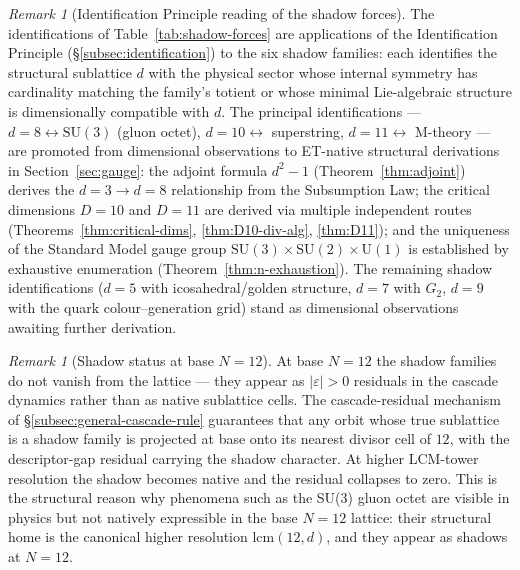 \documentclass[11pt,a4paper]{article}
\theoremstyle{definition}
\theoremstyle{remark}
\newtheorem{remark}[theorem]{Remark}
\begin{document}
\begin{remark}[Identification Principle reading of the shadow forces]\label{rem:shadow-identification}
The identifications of Table~\ref{tab:shadow-forces} are applications of the Identification Principle (\S\ref{subsec:identification}) to the six shadow families: each identifies the structural sublattice $d$ with the physical sector whose internal symmetry has cardinality matching the family's totient or whose minimal Lie-algebraic structure is dimensionally compatible with $d$. The principal identifications --- $d=8 \leftrightarrow \mathrm{SU}(3)$ (gluon octet), $d=10 \leftrightarrow$ superstring, $d=11 \leftrightarrow$ M-theory --- are promoted from dimensional observations to ET-native structural derivations in Section~\ref{sec:gauge}: the adjoint formula $d^{2}-1$ (Theorem~\ref{thm:adjoint}) derives the $d=3 \to d=8$ relationship from the Subsumption Law; the critical dimensions $D=10$ and $D=11$ are derived via multiple independent routes (Theorems~\ref{thm:critical-dims}, \ref{thm:D10-div-alg}, \ref{thm:D11}); and the uniqueness of the Standard Model gauge group $\mathrm{SU}(3)\times\mathrm{SU}(2)\times\mathrm{U}(1)$ is established by exhaustive enumeration (Theorem~\ref{thm:n-exhaustion}). The remaining shadow identifications ($d=5$ with icosahedral/golden structure, $d=7$ with $G_{2}$, $d=9$ with the quark colour--generation grid) stand as dimensional observations awaiting further derivation.
\end{remark}

\begin{remark}[Shadow status at base $N=12$]\label{rem:shadow-base}
At base $N=12$ the shadow families do not vanish from the lattice --- they appear as $|\varepsilon|>0$ residuals in the cascade dynamics rather than as native sublattice cells. The cascade-residual mechanism of \S\ref{subsec:general-cascade-rule} guarantees that any orbit whose true sublattice is a shadow family is projected at base onto its nearest divisor cell of $12$, with the descriptor-gap residual carrying the shadow character. At higher LCM-tower resolution the shadow becomes native and the residual collapses to zero. This is the structural reason why phenomena such as the SU(3) gluon octet are visible in physics but not natively expressible in the base $N=12$ lattice: their structural home is the canonical higher resolution $\mathrm{lcm}(12,d)$, and they appear as shadows at $N=12$.
\end{remark}

\end{document}
